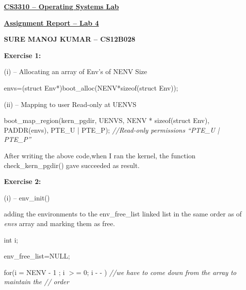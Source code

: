 \documentclass[a4paper,portrait,12pt]{article}
\begin{document}
\setlength{\oddsidemargin}{0.7875in-1in}
\setlength{\textwidth}{\paperwidth - 0.7875in-0.7875in}

\begin{center}
\textbf{\uline{CS3310 -- Operating Systems Lab}}
\end{center}

\begin{center}
\textbf{\uline{Assignment Report -- Lab 4}}
\end{center}


\begin{center}
\textbf{SURE MANOJ KUMAR -- CS12B028}
\end{center}


\textbf{Exercise 1:}





(i) -- Allocating an array of Env's of NENV Size





envs=(struct Env*)boot\_alloc(NENV*sizeof(struct Env));





(ii) -- Mapping to user Read-only at UENVS





boot\_map\_region(kern\_pgdir, UENVS, NENV * sizeof(struct Env), PADDR(envs), PTE\_U | PTE\_P); \emph{//}\emph{Read-only permissions  {``}PTE\_U | PTE\_P''}





After writing the above code,when I ran the kernel, the function check\_kern\_pgdir()  gave succeeded as result.





\textbf{Exercise 2:}





(i) -- env\_init()





adding the environments to the env\_free\_list linked list in the same order as of \emph{envs }array and marking them as free.





int i;


env\_free\_list=NULL;


for(i = NENV - 1 ; i $>$= 0; i - - )   \emph{//we have to come down from the array to maintain the 					   //	order}
\end{document}
